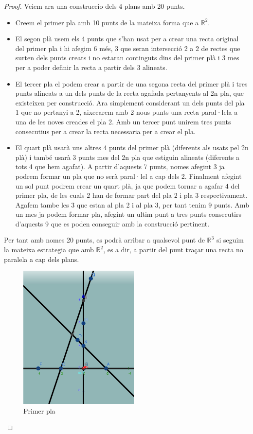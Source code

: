 \documentclass[12pt, a4papre]{article}
\begin{document}
\begin{proof}
	Veiem ara una construccio dels 4 plans amb 20 punts.
	
	\begin{itemize}
		\item Creem el primer pla amb 10 punts de la mateixa forma que a $\mathbb{R}^2$. 
		\item El segon plà usem els 4 punts que s'han usat per a crear una recta original del primer pla i hi afegim 6 més, 3 que seran intersecció 2 a 2 de rectes que surten dels punts creats i no estaran continguts dins del primer plà i 3 mes per a poder definir la recta a partir dels 3 alineats. 
		\item El tercer pla el podem crear a partir de una segona recta del primer plà i tres punts alineats a un dels punts de la recta agafada pertanyents al 2n pla, que existeixen per construcció. Ara simplement considerant un dels punts del pla 1 que no pertanyi a 2, aixecarem amb 2 nous punts una recta paral·lela a una de les noves creades el pla 2. Amb un tercer punt unirem tres punts consecutius per a crear la recta necessaria per a crear el pla.
	
		\item El quart plà usarà uns altres 4 punts del primer plà (diferents als usats pel 2n plà) i també usarà 3 punts mes del 2n pla que estiguin alineats (diferents a tots 4 que hem agafat). A partir d'aquests 7 punts, nomes afegint 3 ja podrem formar un pla que no serà paral·lel a cap dels 2. Finalment afegint un sol punt podrem crear un quart plà, ja que podem tornar a agafar 4 del primer pla, de les cuals 2 han de formar part del pla 2 i pla 3 respectivament. Agafem tambe les 3 que estan al pla 2 i al pla 3, per tant tenim 9 punts. Amb un mes ja podem formar pla, afegint un ultim punt a tres punts consecutirs d'aquests 9 que es poden conseguir amb la construcció pertinent.
		
		 
	\end{itemize}
	
	Per tant amb nomes 20 punts, es podrà arribar a qualsevol punt de $\mathbb{R}^3$ si seguim la mateixa estrategia que amb  $\mathbb{R}^2$, es a dir, a partir del punt traçar una recta no paralela a cap dels plans.
	
	\begin{figure}[H]
		\begin{center}
		\includegraphics[width=60mm]{primer_pla.png}
		\caption{Primer pla}
		\end{center}
	\end{figure}
	

\end{proof}
\end{document}
